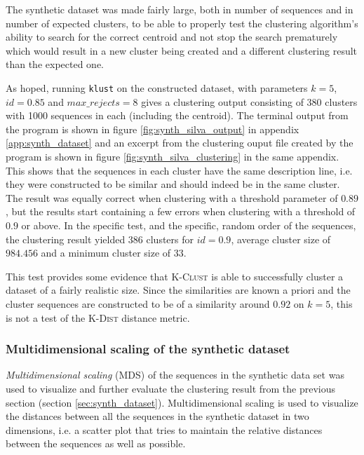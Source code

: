 The synthetic dataset was made fairly large, both in number of sequences and in
number of expected clusters, to be able to properly test the clustering
algorithm's ability to search for the correct centroid and not stop the search
prematurely which would result in a new cluster being created and a different
clustering result than the expected one.

As hoped, running \texttt{klust} on the constructed dataset, with parameters
$k=5$, $id=0.85$ and $max\_rejects=8$ gives a clustering output consisting of
380 clusters with 1000 sequences in each (including the centroid). The terminal
output from the program is shown in figure \ref{fig:synth_silva_output} in
appendix \ref{app:synth_dataset} and an excerpt from the clustering ouput file
created by the program is shown in figure \ref{fig:synth_silva_clustering} in
the same appendix. This shows that the sequences in each cluster have the same
description line, i.e. they were constructed to be similar and should indeed be
in the same cluster. The result was equally correct when clustering with a
threshold parameter of $0.89$, but the results start containing a few errors
when clustering with a threshold of $0.9$ or above. In the specific test, and
the specific, random order of the sequences, the clustering result yielded 386
clusters for $id=0.9$, average cluster size of $984.456$ and a minimum cluster
size of $33$.


This test provides some evidence that \textsc{K-Clust} is able to successfully
cluster a dataset of a fairly realistic size. Since the similarities are known
a priori and the cluster sequences are constructed to be of a similarity around
$0.92$ on $k=5$, this is not a test of the \textsc{K-Dist} distance metric.


\subsubsection{Multidimensional scaling of the synthetic dataset}
\label{sec:mds_synth}

\emph{Multidimensional scaling} (MDS) of the sequences in the synthetic data
set was used to visualize and further evaluate the clustering result from the
previous section (section \ref{sec:synth_dataset}). Multidimensional scaling
is used to visualize the distances between all the sequences in the synthetic
dataset in two dimensions, i.e. a scatter plot that tries to maintain the
relative distances between the sequences as well as possible.

